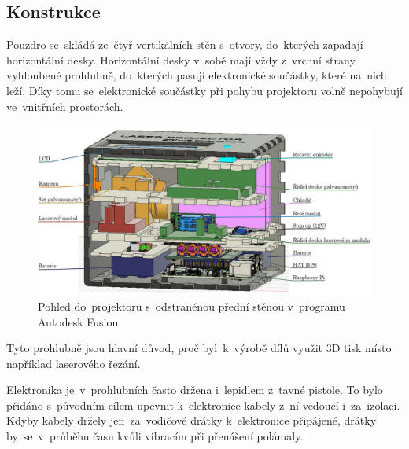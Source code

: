 \subsection{Konstrukce}
Pouzdro se~skládá ze~čtyř vertikálních stěn s~otvory, do~kterých zapadají horizontální desky. Horizontální desky v~sobě mají vždy z~vrchní strany vyhloubené prohlubně, do~kterých pasují elektronické součástky, které na~nich leží. Díky tomu se~elektronické součástky při pohybu projektoru volně nepohybují ve~vnitřních prostorách.

\begin{figure}[htb]
  \centering
  \includegraphics[width=1\textwidth]{img/case-sideview.jpg}
  \caption{\label{fig:case-sideview} Pohled do~projektoru s~odstraněnou přední stěnou v~programu Autodesk Fusion}
\end{figure}

Tyto prohlubně jsou hlavní důvod, proč byl~k~výrobě dílů využit 3D tisk místo například laserového řezání.

Elektronika je~v~prohlubních často držena i~lepidlem z~tavné pistole.
To bylo přidáno s~původním cílem upevnit k~elektronice kabely z~ní vedoucí i~za~izolaci. Kdyby kabely držely jen~za~vodičové drátky k~elektronice připájené, drátky by~se~v~průběhu času kvůli vibracím při přenášení polámaly.


